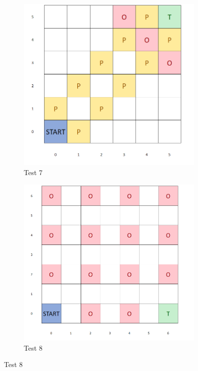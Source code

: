 \documentclass{article}
\begin{document}
\begin{appendices}
\begin{figure}[H]
   	 \centering
     \begin{subfigure}[b]{0.45\textwidth}
         \centering
         \includegraphics[width=\textwidth]{images/test7.png}
         \caption{Test 7}
         \label{fig:test17}
     \end{subfigure}
     \hfill
     \begin{subfigure}[b]{0.45\textwidth}
         \centering
         \includegraphics[width=\textwidth]{images/test8.png}
         \caption{Test 8}
         \label{fig:test18}
     \end{subfigure}
\end{figure}


\end{appendices}
\end{document}
